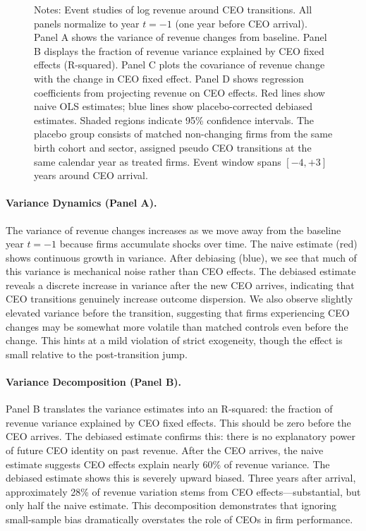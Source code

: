 \documentclass[11pt,a4paper]{article}
\begin{document}
\begin{figure}[htbp]
\label{fig:application}
\begin{minipage}{0.95\textwidth}
\footnotesize
Notes: Event studies of log revenue around CEO transitions. All panels normalize to year $t=-1$ (one year before CEO arrival). Panel A shows the variance of revenue changes from baseline. Panel B displays the fraction of revenue variance explained by CEO fixed effects (R-squared). Panel C plots the covariance of revenue change with the change in CEO fixed effect. Panel D shows regression coefficients from projecting revenue on CEO effects. Red lines show naive OLS estimates; blue lines show placebo-corrected debiased estimates. Shaded regions indicate 95\% confidence intervals. The placebo group consists of matched non-changing firms from the same birth cohort and sector, assigned pseudo CEO transitions at the same calendar year as treated firms. Event window spans $[-4, +3]$ years around CEO arrival.
\end{minipage}
\end{figure}

\paragraph{Variance Dynamics (Panel A).} The variance of revenue changes increases as we move away from the baseline year $t=-1$ because firms accumulate shocks over time. The naive estimate (red) shows continuous growth in variance. After debiasing (blue), we see that much of this variance is mechanical noise rather than CEO effects. The debiased estimate reveals a discrete increase in variance after the new CEO arrives, indicating that CEO transitions genuinely increase outcome dispersion. We also observe slightly elevated variance before the transition, suggesting that firms experiencing CEO changes may be somewhat more volatile than matched controls even before the change. This hints at a mild violation of strict exogeneity, though the effect is small relative to the post-transition jump.

\paragraph{Variance Decomposition (Panel B).} Panel B translates the variance estimates into an R-squared: the fraction of revenue variance explained by CEO fixed effects. This should be zero before the CEO arrives. The debiased estimate confirms this: there is no explanatory power of future CEO identity on past revenue. After the CEO arrives, the naive estimate suggests CEO effects explain nearly 60\% of revenue variance. The debiased estimate shows this is severely upward biased. Three years after arrival, approximately 28\% of revenue variation stems from CEO effects---substantial, but only half the naive estimate. This decomposition demonstrates that ignoring small-sample bias dramatically overstates the role of CEOs in firm performance.
\end{document}
